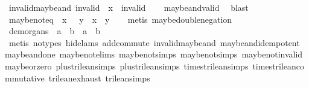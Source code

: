 \begin{isabellebody}
\ invalid{\isacharunderscore}maybe{\isacharunderscore}and{\isacharcolon}\ {\isachardoublequoteopen}invalid\ {\isasymand}\isactrlsub {\isacharquery}\ x\ {\isacharequal}\ invalid{\isachardoublequoteclose}\isanewline
%
\isadelimproof
\ \ %
\endisadelimproof
%
\isatagproof
{}\isamarkupfalse%
\ maybe{\isacharunderscore}and{\isacharunderscore}valid\ \isamarkupfalse%
\ blast%
\endisatagproof
{\isafoldproof}%
%
\isadelimproof
\isanewline
%
\endisadelimproof
\isanewline
{}\isamarkupfalse%
\ maybe{\isacharunderscore}not{\isacharunderscore}eq{\isacharcolon}\ {\isachardoublequoteopen}{\isacharparenleft}{\isasymnot}\isactrlsub {\isacharquery}\ x\ {\isacharequal}\ {\isasymnot}\isactrlsub {\isacharquery}\ y{\isacharparenright}\ {\isacharequal}\ {\isacharparenleft}x\ {\isacharequal}\ y{\isacharparenright}{\isachardoublequoteclose}\isanewline
%
\isadelimproof
\ \ %
\endisadelimproof
%
\isatagproof
{}\isamarkupfalse%
\ {\isacharparenleft}metis\ maybe{\isacharunderscore}double{\isacharunderscore}negation{\isacharparenright}%
\endisatagproof
{\isafoldproof}%
%
\isadelimproof
\isanewline
%
\endisadelimproof
\isanewline
{}\isamarkupfalse%
\ de{\isacharunderscore}morgans{\isacharunderscore}{}{\isacharcolon}\ {\isachardoublequoteopen}{\isasymnot}\isactrlsub {\isacharquery}\ {\isacharparenleft}a\ {\isasymor}\isactrlsub {\isacharquery}\ b{\isacharparenright}\ {\isacharequal}\ {\isacharparenleft}{\isasymnot}\isactrlsub {\isacharquery}a{\isacharparenright}\ {\isasymand}\isactrlsub {\isacharquery}\ {\isacharparenleft}{\isasymnot}\isactrlsub {\isacharquery}b{\isacharparenright}{\isachardoublequoteclose}\isanewline
%
\isadelimproof
\ \ %
\endisadelimproof
%
\isatagproof
{}\isamarkupfalse%
\ {\isacharparenleft}metis\ {\isacharparenleft}no{\isacharunderscore}types{\isacharcomma}\ hide{\isacharunderscore}lams{\isacharparenright}\ add{\isachardot}commute\ invalid{\isacharunderscore}maybe{\isacharunderscore}and\ maybe{\isacharunderscore}and{\isacharunderscore}idempotent\ maybe{\isacharunderscore}and{\isacharunderscore}one\ maybe{\isacharunderscore}not{\isachardot}elims\ maybe{\isacharunderscore}not{\isachardot}simps{\isacharparenleft}{}{\isacharparenright}\ maybe{\isacharunderscore}not{\isachardot}simps{\isacharparenleft}{}{\isacharparenright}\ maybe{\isacharunderscore}not{\isacharunderscore}invalid\ maybe{\isacharunderscore}or{\isacharunderscore}zero\ plus{\isacharunderscore}trilean{\isachardot}simps{\isacharparenleft}{}{\isacharparenright}\ plus{\isacharunderscore}trilean{\isachardot}simps{\isacharparenleft}{}{\isacharparenright}\ times{\isacharunderscore}trilean{\isachardot}simps{\isacharparenleft}{}{\isacharparenright}\ times{\isacharunderscore}trilean{\isacharunderscore}commutative\ trilean{\isachardot}exhaust\ trilean{\isachardot}simps{\isacharparenleft}{}{\isacharparenright}{\isacharparenright}%

\end{isabellebody}
